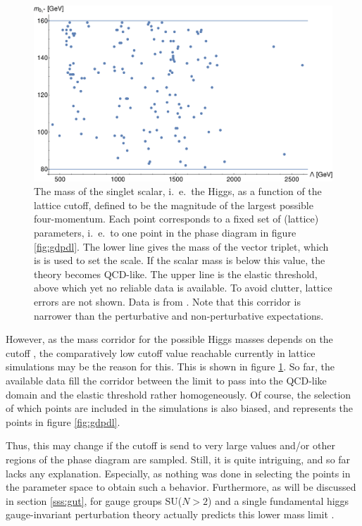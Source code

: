 \documentclass[final,12pt,3p,longtitle]{elsarticle}
\newcommand*{\1}{1\!\!\!\bot}
\begin{document}
\begin{figure}[hbtp!]
\includegraphics[width=\linewidth]{hml}
\caption{\label{fig:hml}The mass of the singlet scalar, i.\ e.\ the Higgs, as a function of the lattice cutoff, defined to be the magnitude of the largest possible four-momentum. Each point corresponds to a fixed set of (lattice) parameters, i.\ e.\ to one point in the phase diagram in figure \ref{fig:gdpdl}. The lower line gives the mass of the vector triplet, which is is used to set the scale. If the scalar mass is below this value, the theory becomes QCD-like. The upper line is the elastic threshold, above which yet no reliable data is available. To avoid clutter, lattice errors are not shown. Data is from \cite{Maas:unpublished,Maas:2014pba,Torek:2016ede}. Note that this corridor is narrower than the perturbative \cite{Altarelli:1994rb,Djouadi:2009nu} and non-perturbative \cite{Eichhorn:2015kea,Gies:2017ajd,Gies:2017zwf} expectations.}
\end{figure}

However, as the mass corridor for the possible Higgs masses depends on the cutoff \cite{Altarelli:1994rb,Callaway:1988ya,Bohm:2001yx,Djouadi:2009nu,Eichhorn:2015kea,Gies:2017ajd,Gies:2017zwf}, the comparatively low cutoff value reachable currently in lattice simulations may be the reason for this. This is shown in figure \ref{fig:hml}. So far, the available data fill the corridor between the limit to pass into the QCD-like domain and the elastic threshold rather homogeneously. Of course, the selection of which points are included in the simulations is also biased, and represents the points in figure \ref{fig:gdpdl}.

Thus, this may change if the cutoff is send to very large values and/or other regions of the phase diagram are sampled. Still, it is quite intriguing, and so far lacks any explanation. Especially, as nothing was done in selecting the points in the parameter space to obtain such a behavior. Furthermore, as will be discussed in section \ref{sss:gut}, for gauge groups SU($N>2$) and a single fundamental higgs gauge-invariant perturbation theory actually predicts this lower mass limit \cite{Maas:2017xzh}.
\end{document}
